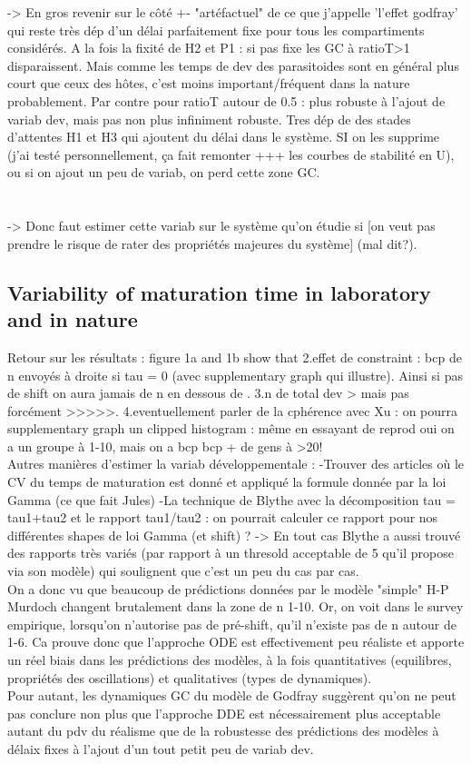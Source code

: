 \documentclass[12pt,a4paper,onecolumn]{article}
\begin{document}
\tabto{1.5 cm} -> En gros revenir sur le côté +- "artéfactuel" de ce que j'appelle 'l'effet godfray' qui reste très dép d'un délai parfaitement fixe pour tous les compartiments considérés. A la fois la fixité de H2 et P1 : si pas fixe les GC à ratioT>1 disparaissent. Mais comme les temps de dev des parasitoides sont en général plus court que ceux des hôtes, c'est moins important/fréquent dans la nature probablement. Par contre pour ratioT autour de 0.5 : plus robuste à l'ajout de variab dev, mais pas non plus infiniment robuste. Tres dép de des stades d'attentes H1 et H3 qui ajoutent du délai dans le système. SI on les supprime (j'ai testé personnellement, ça fait remonter +++ les courbes de stabilité en U), ou si on ajout un peu de variab, on perd cette zone GC. 
\\
\\
\\
-> Donc faut estimer cette variab sur le système qu'on étudie si [on veut pas prendre le risque de rater des propriétés majeures du système] (mal dit?).


\subsection{Variability of maturation time in laboratory and in nature}
Retour sur les résultats : figure 1a and 1b show that 
	2.effet de constraint : bcp de n envoyés à droite si tau = 0 (avec supplementary graph qui illustre). Ainsi si pas de shift on aura jamais de n en dessous de . 
	3.n de total dev > mais pas forcément >>>>>.
	4.eventuellement parler de la cphérence avec Xu : on pourra supplementary graph un clipped histogram : même en essayant de reprod oui on a un groupe à 1-10, mais on a bcp bcp + de gens à >20!
\\
Autres manières d'estimer la variab développementale :
	-Trouver des articles où le CV du temps de maturation est donné et appliqué la formule donnée par la loi Gamma (ce que fait Jules)
	-La technique de Blythe avec la décomposition tau = tau1+tau2 et le rapport tau1/tau2 : on pourrait calculer ce rapport pour nos différentes shapes de loi Gamma (et shift) ? -> En tout cas Blythe a aussi trouvé des rapports très variés (par rapport à un thresold acceptable de 5 qu'il propose via son modèle)  qui soulignent que c'est un peu du cas par cas.
\\
On a donc vu que beaucoup de prédictions données par le modèle "simple" H-P Murdoch changent brutalement dans la zone de n 1-10. Or, on voit dans le survey empirique, lorsqu'on n'autorise pas de pré-shift, qu'il n'existe pas de n autour de 1-6. Ca prouve donc que l'approche ODE est effectivement peu réaliste et apporte un réel biais dans les prédictions des modèles, à la fois quantitatives (equilibres, propriétés des oscillations) et qualitatives (types de dynamiques). 
\\
Pour autant, les dynamiques GC du modèle de Godfray suggèrent qu'on ne peut pas conclure non plus que l'approche DDE est nécessairement plus acceptable autant du pdv du réalisme que de la robustesse des prédictions des modèles à délaix fixes à l'ajout d'un tout petit peu de variab dev.
\end{document}
